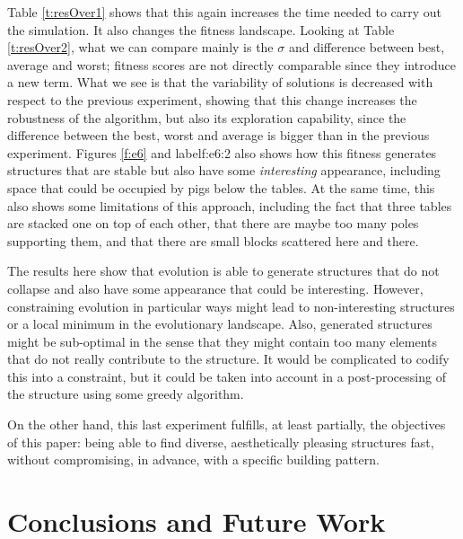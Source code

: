 \documentclass[a4paper,twoside]{article}
\begin{document}
Table \ref{t:resOver1} shows that this again
increases the time needed to carry out the simulation. It also changes
the fitness landscape. Looking at Table \ref{t:resOver2}, what we
can compare mainly is the $\sigma$ and difference between best,
average and worst; fitness scores are not directly comparable since
they introduce a new term. What we see is that the variability of
solutions is decreased with respect to the previous experiment,
showing that this change increases the robustness of the algorithm,
but also its exploration capability, since the difference between the
best, worst and average is bigger than in the previous
experiment. Figures \ref{f:e6} and label{f:e6:2} also
shows how this fitness generates structures that are stable but also
have some {\em interesting} appearance, including space that could be
occupied by pigs below the tables. At the same time, this also shows
some limitations of this approach, including the fact that three
tables are stacked one on top of each other, that there are maybe too
many poles supporting them, and that there are small blocks scattered
here and there.

The results here show that evolution is able to generate structures
that do not collapse and also have some appearance that could be
interesting. However, constraining evolution in particular ways might
lead to non-interesting structures or a local minimum in the
evolutionary landscape. Also, generated structures might be
sub-optimal in the sense that they might contain too many elements
that do not really contribute to the structure. It would be
complicated to codify this into a constraint, but it could be taken
into account in a post-processing of the structure using some greedy
algorithm.

On the other hand, this last experiment fulfills, at least partially,
the objectives of this paper: being able to find diverse,
aesthetically pleasing structures fast, without compromising, in
advance, with a specific building pattern.


%
\section{Conclusions and Future Work} 
\label{sec:conclusions}
\end{document}
